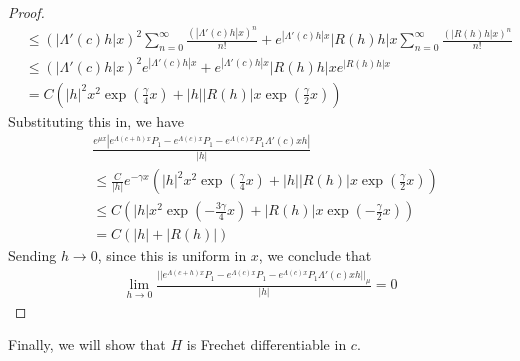 \documentclass[thesis.tex]{subfiles}
\begin{document}
\begin{lemma}
\begin{proof}
\begin{align*}
&\leq (|\Lambda'(c)h|x)^2 \sum_{n=0}^\infty \frac{(|\Lambda'(c)h|x)^n}{n!} + e^{|\Lambda'(c)h|x} |R(h)h|x \sum_{n=0}^\infty \frac{(|R(h)h|x)^n}{n!} \\
&\leq (|\Lambda'(c)h|x)^2 e^{|\Lambda'(c)h|x} + e^{|\Lambda'(c)h|x} |R(h)h|x e^{|R(h)h|x} \\
&= C \left(|h|^2 x^2 \exp\left(\frac{\gamma}{4}x\right) 
+ |h| |R(h)|x \exp\left(\frac{\gamma}{2}x\right) \right)
\end{align*}
Substituting this in, we have
\begin{align*}
&\frac{e^{\mu x} |e^{\Lambda(c+h)x}P_1 - e^{\Lambda(c)x}P_1 - e^{\Lambda(c)x} P_1 \Lambda'(c)x h|}{|h|} \\
&\leq \frac{C}{|h|} e^{-\gamma x} \left(|h|^2 x^2 \exp\left(\frac{\gamma}{4}x\right) 
+ |h| |R(h)|x \exp\left(\frac{\gamma}{2}x\right) \right) \\
&\leq C \left( |h| x^2 \exp\left(-\frac{3\gamma}{4}x\right) + |R(h)| x \exp\left(-\frac{\gamma}{2}x\right) \right) \\
&= C (|h| + |R(h)|)
\end{align*}
Sending $h \rightarrow 0$, since this is uniform in $x$, we conclude that
\begin{align*}
\lim_{h \rightarrow 0}
\frac{||e^{\Lambda(c+h)x}P_1 - e^{\Lambda(c)x}P_1 - e^{\Lambda(c)x} P_1 \Lambda'(c)x h||_\mu}{|h|} = 0
\end{align*}
\end{proof}
\end{lemma}

Finally, we will show that $H$ is Frechet differentiable in $c$.
\end{document}
